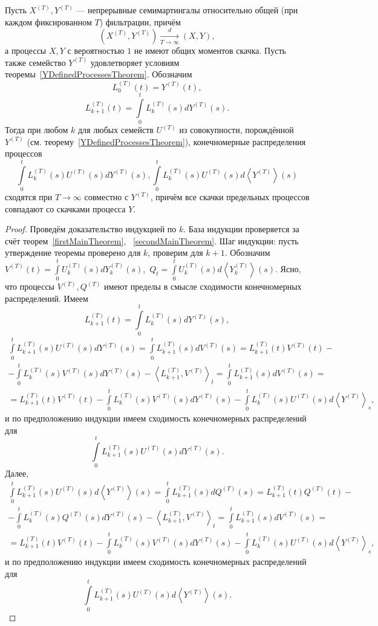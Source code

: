 \documentclass[12pt, a4paper, titlepage]{article}
\begin{document}
\begin{theorem}\label{generalTheorem}
 Пусть $X^{(T)}, Y^{(T)}$ --- непрерывные семимартингалы относительно общей (при каждом фиксированном $T$)
фильтрации, причём
$$(X^{(T)}, Y^{(T)})\xrightarrow[T \to \infty]{d}(X, Y),$$
а процессы $X, Y$ с вероятностью $1$ не имеют общих моментов скачка. 
Пусть также семейство $Y^{(T)}$ удовлетворяет условиям теоремы~\ref{YDefinedProcessesTheorem}.
Обозначим
$$L^{(T)}_0(t) = Y^{(T)}(t),$$
$$L^{(T)}_{k+1}(t) = \int\limits_0^t L_k^{(T)}(s) dY^{(T)}(s).$$
Тогда при любом $k$ для любых семейств $U^{(T)}$ из совокупности, 
порождённой $Y^{(T)}$ (см. теорему~\ref{YDefinedProcessesTheorem}),
конечномерные распределения процессов
$$\int\limits_0^t L_k^{(T)}(s)U^{(T)}(s)dY^{(T)}(s),
\int\limits_0^t L_k^{(T)}(s)U^{(T)}(s)d\left<Y^{(T)}\right>(s)$$
сходятся при $T \to \infty$ совместно с $Y^{(T)}$,
причём все скачки предельных процессов совпадают со скачками процесса $Y.$
\begin{proof}
 Проведём доказательство индукцией по $k$. 
База индукции проверяется за счёт теорем~\ref{firstMainTheorem},
~\ref{secondMainTheorem}.
Шаг индукции: пусть утверждение теоремы проверено для $k$, проверим для $k+1$. 
Обозначим $V^{(T)}(t)=\int\limits_0^t U_k^{(T)}(s)dY_k^{(T)}(s),$
$Q_t=\int\limits_0^t U_k^{(T)}(s)d\left<Y_k^{(T)}\right>(s).$
Ясно, что процессы $V^{(T)}, Q^{(T)}$ имеют пределы в смысле сходимости
конечномерных распределений.
Имеем
$$L^{(T)}_{k+1}(t) = \int\limits_0^t L_k^{(T)}(s) dY^{(T)}(s),$$
\begin{multline*}
 \int\limits_0^t L_{k+1}^{(T)}(s)U^{(T)}(s)dY^{(T)}(s) = \int\limits_0^t L_{k+1}^{(T)}(s) dV^{(T)}(s)=
L_{k+1}^{(T)}(t) V^{(T)}(t)-\\-
\int\limits_0^t L_k^{(T)}(s)V^{(T)}(s)dY^{(T)}(s)-
\left<L_{k+1}^{(T)}, V^{(T)}\right>_t=
\int\limits_0^t L_{k+1}^{(T)}(s) dV^{(T)}(s)=\\=
L_{k+1}^{(T)}(t) V^{(T)}(t)-
\int\limits_0^t L_k^{(T)}(s)V^{(T)}(s)dY^{(T)}(s)-
\int\limits_0^t L_k^{(T)}(s)U^{(T)}(s)d\left<Y^{(T)}\right>_s,
\end{multline*}
и по предположению индукции имеем сходимость конечномерных распределений для 
$$\int\limits_0^t L_{k+1}^{(T)}(s)U^{(T)}(s)dY^{(T)}(s).$$
Далее, 
\begin{multline*}
 \int\limits_0^t L_{k+1}^{(T)}(s)U^{(T)}(s)d\left<Y^{(T)}\right>(s) =
\int\limits_0^t L_{k+1}^{(T)}(s) dQ^{(T)}(s)=
L_{k+1}^{(T)}(t) Q^{(T)}(t)-\\-
\int\limits_0^t L_k^{(T)}(s)Q^{(T)}(s)dY^{(T)}(s)-
\left<L_{k+1}^{(T)}, V^{(T)}\right>_t=
\int\limits_0^t L_{k+1}^{(T)}(s) dV^{(T)}(s)=\\=
L_{k+1}^{(T)}(t) V^{(T)}(t)-
\int\limits_0^t L_k^{(T)}(s)V^{(T)}(s)dY^{(T)}(s)-
\int\limits_0^t L_k^{(T)}(s)U^{(T)}(s)d\left<Y^{(T)}\right>_s,
\end{multline*}
и по предположению индукции имеем сходимость конечномерных распределений для 
$$\int\limits_0^t L_{k+1}^{(T)}(s)U^{(T)}(s)d\left<Y^{(T)}\right>(s).$$
\end{proof}
\end{theorem}
\end{document}
